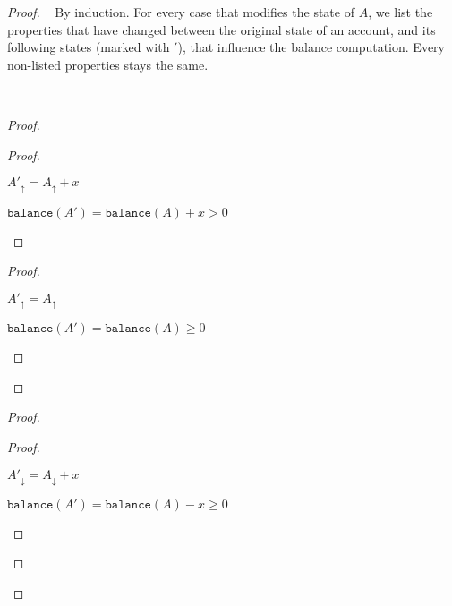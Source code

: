 \documentclass[9pt]{article}   	%
\begin{document}
\begin{proof}
\pfsketch~ By induction.
	For every case that modifies the state of $A$, we list the properties that have changed between the original state of an account, and its following states (marked with $'$), that influence the balance computation. Every non-listed properties stays the same.
	
\pf~		
	\begin{proof}
		\begin{proof}
			\begin{pfenum}
				\item $A'_\uparrow = A_\uparrow + x$
				\item $\texttt{balance}(A') = \texttt{balance}(A) + x > 0$
			\end{pfenum}
		\end{proof}
		
		\begin{proof}
			\begin{pfenum}
				\item $A'_\uparrow = A_\uparrow$
				\item $\texttt{balance}(A') = \texttt{balance}(A) \geq 0$
			\end{pfenum}
		\end{proof}		
	\end{proof}
	
	\begin{proof}
		\begin{proof}
			\begin{pfenum}
				\item $A'_\downarrow = A_\downarrow + x$
				\item $\texttt{balance}(A') = \texttt{balance}(A) - x \geq 0$
			\end{pfenum}
		\end{proof}
		

\end{proof}
\end{proof}
\end{document}
